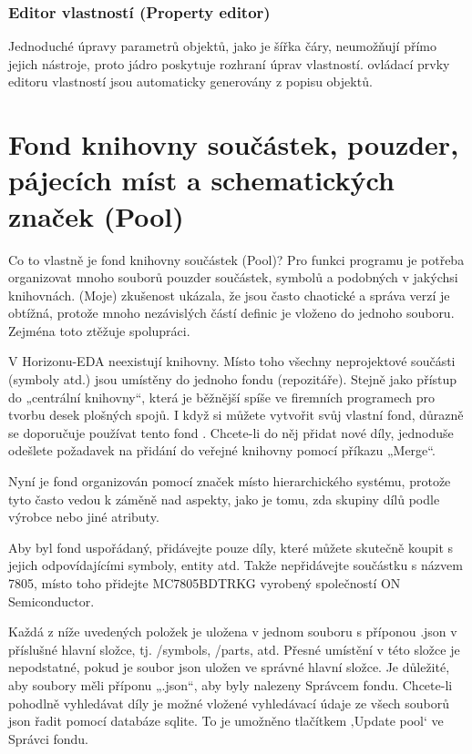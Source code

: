 \documentclass[letterpaper,10pt,czech]{sphinxmanual}
\begin{document}
\subsection{Editor vlastností (Property editor)}
\label{\detokenize{theory-of-operation:editor-vlastnosti-property-editor}}
Jednoduché úpravy parametrů objektů, jako je šířka čáry, neumožňují přímo jejich nástroje,
proto jádro poskytuje rozhraní úprav vlastností.
ovládací prvky editoru vlastností jsou automaticky generovány z popisu objektů.


\chapter{Fond knihovny součástek, pouzder, pájecích míst a schematických značek (Pool)}
\label{\detokenize{pool:fond-knihovny-soucastek-pouzder-pajecich-mist-a-schematickych-znacek-pool}}\label{\detokenize{pool::doc}}
Co to vlastně je fond knihovny součástek (Pool)? Pro funkci programu je potřeba organizovat mnoho souborů pouzder součástek, symbolů a podobných v jakýchsi knihovnách. (Moje) zkušenost ukázala, že jsou často chaotické a správa verzí je obtížná, protože mnoho nezávislých částí definic je vloženo do jednoho souboru. Zejména toto ztěžuje spolupráci.

V Horizonu-EDA neexistují knihovny. Místo toho všechny neprojektové součásti (symboly atd.) jsou umístěny do jednoho fondu (repozitáře). Stejně jako přístup do „centrální knihovny“, která je běžnější spíše ve firemních programech pro tvorbu desek plošných spojů. I když si můžete vytvořit svůj vlastní fond, důrazně se doporučuje používat tento fond
. Chcete-li do něj přidat nové díly, jednoduše odešlete požadavek na přidání do veřejné knihovny pomocí příkazu „Merge“.

Nyní je fond organizován pomocí značek místo hierarchického
systému, protože tyto často vedou k záměně nad aspekty, jako je tomu, zda
skupiny dílů podle výrobce nebo jiné atributy.

Aby byl fond uspořádaný, přidávejte pouze díly, které můžete skutečně koupit s jejich odpovídajícími symboly, entity atd. Takže nepřidávejte součástku s názvem 7805, místo toho přidejte MC7805BDTRKG vyrobený společností ON Semiconductor.

Každá z níže uvedených položek je uložena v jednom souboru s příponou .json v příslušné hlavní složce, tj. /symbols, /parts, atd. Přesné umístění v této složce je nepodstatné, pokud je soubor json uložen ve
správné hlavní složce. Je důležité, aby soubory měli příponu „.json“, aby byly nalezeny Správcem fondu. Chcete-li pohodlně vyhledávat díly je možné vložené vyhledávací údaje ze všech souborů json řadit pomocí databáze sqlite. To je umožněno tlačítkem ‚Update pool‘ ve Správci fondu.
\end{document}
